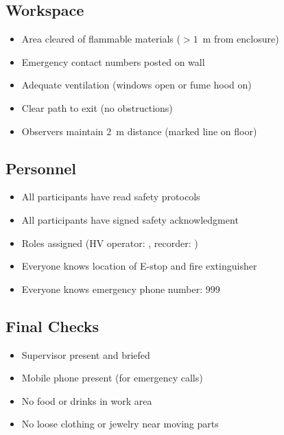 \documentclass[11pt]{article}
\begin{document}
\subsection{Workspace}

\begin{itemize}
\item[$\square$] Area cleared of flammable materials ($>1$~m from enclosure)
\item[$\square$] Emergency contact numbers posted on wall
\item[$\square$] Adequate ventilation (windows open or fume hood on)
\item[$\square$] Clear path to exit (no obstructions)
\item[$\square$] Observers maintain 2~m distance (marked line on floor)
\end{itemize}

\subsection{Personnel}

\begin{itemize}
\item[$\square$] All participants have read safety protocols
\item[$\square$] All participants have signed safety acknowledgment
\item[$\square$] Roles assigned (HV operator: \underline{\hspace{3cm}}, recorder: \underline{\hspace{3cm}})
\item[$\square$] Everyone knows location of E-stop and fire extinguisher
\item[$\square$] Everyone knows emergency phone number: 999
\end{itemize}

\subsection{Final Checks}

\begin{itemize}
\item[$\square$] Supervisor present and briefed
\item[$\square$] Mobile phone present (for emergency calls)
\item[$\square$] No food or drinks in work area
\item[$\square$] No loose clothing or jewelry near moving parts
\end{itemize}
\end{document}
